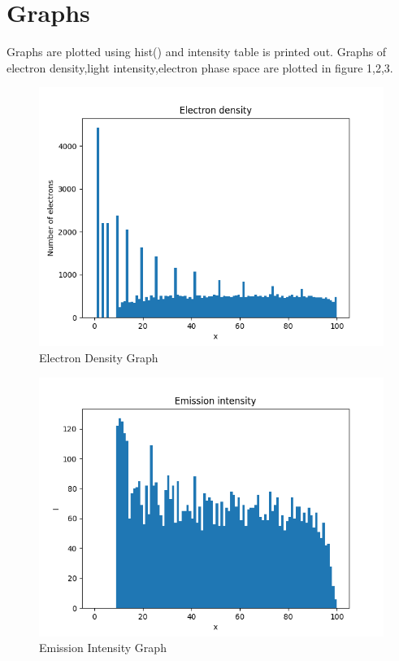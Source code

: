 \documentclass[12pt, a4paper]{article}
\begin{document}
\section*{Graphs}
Graphs are plotted using hist() and intensity table is printed out. Graphs of electron density,light intensity,electron phase space are plotted in figure 1,2,3.

\begin{figure}[!tbh]
\centering
\includegraphics[scale=0.70]{Plot2.png}
\caption{Electron Density Graph}
\label{Figure1}
\end{figure}

\begin{figure}[!tbh]
\centering
\includegraphics[scale=0.70]{Plot3.png}
\caption{Emission Intensity Graph}
\label{Figure2}
\end{figure}
\end{document}
